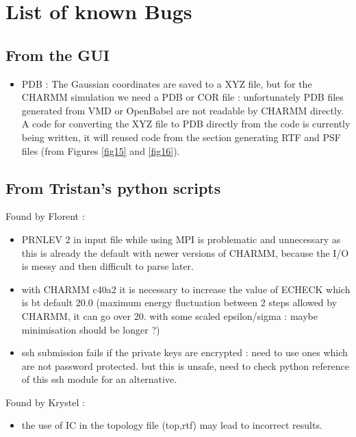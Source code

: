 \documentclass[12pt,a4paper]{article}
\begin{document}

\section{List of known Bugs}

\subsection{From the GUI}

\begin{itemize}
\item PDB : The Gaussian coordinates are saved to a XYZ file, but for the CHARMM simulation we need 
a PDB or COR file : unfortunately PDB files generated from VMD or OpenBabel are not readable by 
CHARMM directly. A code for converting the XYZ file to PDB directly from the code is currently 
being written, it will reused code from the section generating RTF and PSF files (from Figures 
\ref{fig15} and \ref{fig16}).
\end{itemize}

\subsection{From Tristan's python scripts}

Found by Florent :
\begin{itemize}
\item PRNLEV 2 in input file while using MPI is problematic and unnecessary as this is already the 
default with newer versions of CHARMM, because the I/O is messy and then difficult to parse later.
\item with CHARMM c40a2 it is necessary to increase the value of ECHECK which is bt default 20.0 
(maximum energy fluctuation between 2 steps allowed by CHARMM, it can go over 20. with some scaled 
epsilon/sigma : maybe minimisation should be longer ?)
\item ssh submission fails if the private keys are encrypted : need to use ones which are not 
password protected. but this is unsafe, need to check python reference of this ssh module for an 
alternative. 
\end{itemize}

Found by Krystel : 
\begin{itemize}
\item the use of IC in the topology file (top,rtf) may lead to incorrect results.
\end{itemize}
\end{document}
